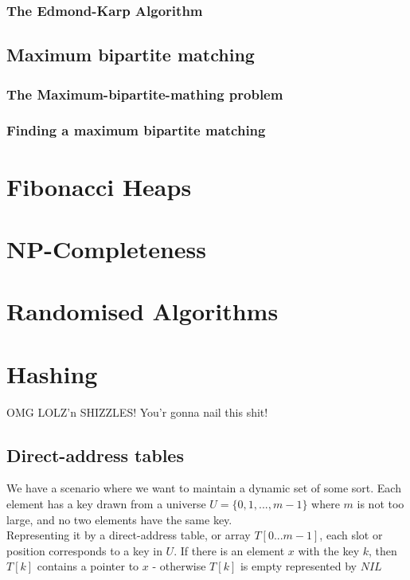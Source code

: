 \documentclass[12pt,a4paper]{article}
\begin{document}
\subsubsection{The Edmond-Karp Algorithm}

\subsection{Maximum bipartite matching}
\subsubsection{The Maximum-bipartite-mathing problem}
\subsubsection{Finding a maximum bipartite matching}

\newpage

\section{Fibonacci Heaps}
\newpage

\section{NP-Completeness}
\newpage

\section{Randomised Algorithms}
\newpage

\section{Hashing}
OMG LOLZ'n SHIZZLES! You'r gonna nail this shit!

\subsection{Direct-address tables}
We have a scenario where we want to maintain a dynamic set of some sort. Each element has a key drawn from a universe $U = \{0, 1, ..., m-1\}$ where $m$ is not too large, and no two elements have the same key. \\

Representing it by a direct-address table, or array $T[0...m-1]$, each slot or position corresponds to a key  in $U$. If there is an element $x$ with the key $k$, then $T[k]$ contains a pointer to $x$ - otherwise $T[k]$ is empty represented by $NIL$\\
\end{document}

